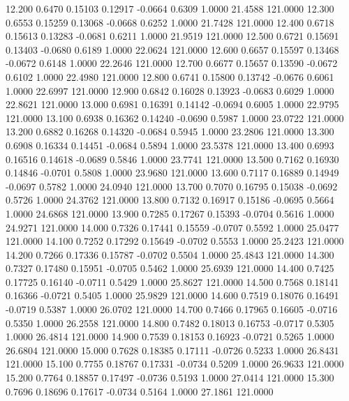   12.200   0.6470   0.15103   0.12917  -0.0664   0.6309   1.0000  21.4588 121.0000
  12.300   0.6553   0.15259   0.13068  -0.0668   0.6252   1.0000  21.7428 121.0000
  12.400   0.6718   0.15613   0.13283  -0.0681   0.6211   1.0000  21.9519 121.0000
  12.500   0.6721   0.15691   0.13403  -0.0680   0.6189   1.0000  22.0624 121.0000
  12.600   0.6657   0.15597   0.13468  -0.0672   0.6148   1.0000  22.2646 121.0000
  12.700   0.6677   0.15657   0.13590  -0.0672   0.6102   1.0000  22.4980 121.0000
  12.800   0.6741   0.15800   0.13742  -0.0676   0.6061   1.0000  22.6997 121.0000
  12.900   0.6842   0.16028   0.13923  -0.0683   0.6029   1.0000  22.8621 121.0000
  13.000   0.6981   0.16391   0.14142  -0.0694   0.6005   1.0000  22.9795 121.0000
  13.100   0.6938   0.16362   0.14240  -0.0690   0.5987   1.0000  23.0722 121.0000
  13.200   0.6882   0.16268   0.14320  -0.0684   0.5945   1.0000  23.2806 121.0000
  13.300   0.6908   0.16334   0.14451  -0.0684   0.5894   1.0000  23.5378 121.0000
  13.400   0.6993   0.16516   0.14618  -0.0689   0.5846   1.0000  23.7741 121.0000
  13.500   0.7162   0.16930   0.14846  -0.0701   0.5808   1.0000  23.9680 121.0000
  13.600   0.7117   0.16889   0.14949  -0.0697   0.5782   1.0000  24.0940 121.0000
  13.700   0.7070   0.16795   0.15038  -0.0692   0.5726   1.0000  24.3762 121.0000
  13.800   0.7132   0.16917   0.15186  -0.0695   0.5664   1.0000  24.6868 121.0000
  13.900   0.7285   0.17267   0.15393  -0.0704   0.5616   1.0000  24.9271 121.0000
  14.000   0.7326   0.17441   0.15559  -0.0707   0.5592   1.0000  25.0477 121.0000
  14.100   0.7252   0.17292   0.15649  -0.0702   0.5553   1.0000  25.2423 121.0000
  14.200   0.7266   0.17336   0.15787  -0.0702   0.5504   1.0000  25.4843 121.0000
  14.300   0.7327   0.17480   0.15951  -0.0705   0.5462   1.0000  25.6939 121.0000
  14.400   0.7425   0.17725   0.16140  -0.0711   0.5429   1.0000  25.8627 121.0000
  14.500   0.7568   0.18141   0.16366  -0.0721   0.5405   1.0000  25.9829 121.0000
  14.600   0.7519   0.18076   0.16491  -0.0719   0.5387   1.0000  26.0702 121.0000
  14.700   0.7466   0.17965   0.16605  -0.0716   0.5350   1.0000  26.2558 121.0000
  14.800   0.7482   0.18013   0.16753  -0.0717   0.5305   1.0000  26.4814 121.0000
  14.900   0.7539   0.18153   0.16923  -0.0721   0.5265   1.0000  26.6804 121.0000
  15.000   0.7628   0.18385   0.17111  -0.0726   0.5233   1.0000  26.8431 121.0000
  15.100   0.7755   0.18767   0.17331  -0.0734   0.5209   1.0000  26.9633 121.0000
  15.200   0.7764   0.18857   0.17497  -0.0736   0.5193   1.0000  27.0414 121.0000
  15.300   0.7696   0.18696   0.17617  -0.0734   0.5164   1.0000  27.1861 121.0000
